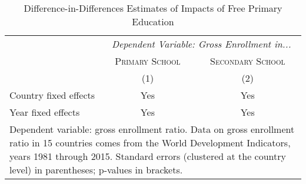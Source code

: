 \documentclass[11pt]{article}
\begin{document}
\begin{table}[h]
\begin{center}
\caption{Difference-in-Differences Estimates of Impacts of Free Primary Education} \label{tab:fpe-effect}

\medskip

\begingroup
\setlength{\tabcolsep}{6pt} %
\renewcommand{\arraystretch}{1.4} %
\begin{tabular}{lcc} 
\multicolumn{1}{p{4.0cm}}{} & \multicolumn{1}{p{4.0cm}}{} & \multicolumn{1}{p{4.0cm}}{} \\	
\hline \hline 	
 & \multicolumn{2}{c}{\emph{Dependent Variable:  Gross Enrollment in...}} \\ 
	& \textsc{Primary School} & \textsc{Secondary School} \\ 
	& (1) & (2) \\ 
\hline
	
Country fixed effects & Yes & Yes  \\
Year fixed effects & Yes  & Yes \\
\hline
\multicolumn{3}{p{12.6cm}}{\footnotesize{Dependent variable:  gross enrollment ratio.  Data on gross enrollment ratio in 15 countries comes from the World Development Indicators, years 1981 through 2015.  Standard errors (clustered at the country level) in parentheses; p-values in brackets.}} \\
\end{tabular}
\endgroup
\end{center}
\end{table}
\end{document}
